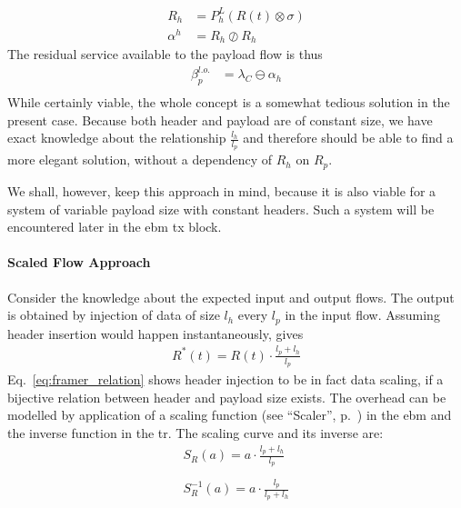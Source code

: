 %
\begin{equation}
\begin{aligned}
R_h &= {P^L_{h}(R(t) \otimes \sigma)}\\
\alpha^h &= R_h \oslash R_h
\label{eq:foi1}
\end{aligned}
\end{equation}
%
The residual service available to the payload flow is thus
%
\begin{equation}
\begin{aligned}
\beta_p^{l.o.} &= \lambda_C \ominus \alpha_h\\
\label{eq:foi2}
\end{aligned}
\end{equation}
%
While certainly viable, the whole concept is a somewhat tedious solution in the present case. Because both header and payload are of constant size, we have exact knowledge
about the relationship $\frac{l_h}{l_p}$ and therefore should be able to find a more elegant solution, without a dependency of $R_h$ on $R_p$.
\par
We shall, however, keep this approach in mind, because it is also viable for a system of variable payload size with constant headers.
Such a system will be encountered later in the \gls{ebm} \gls{tx} block.

\fi

\paragraph{Scaled Flow Approach} 
Consider the knowledge about the expected input and output flows. The output is obtained by injection of data of size $l_h$ every $l_p$ in the input flow. 
Assuming header insertion would happen instantaneously, gives
%
\begin{equation}
\begin{aligned}
R^*(t) = R(t) \cdot \frac{l_p + l_h}{l_p} 
\label{eq:framer_relation}
\end{aligned}
\end{equation}
%
Eq.~\ref{eq:framer_relation} shows header injection to be in fact data scaling, if a bijective relation between header and payload size exists.
The overhead can be modelled by application of a scaling function (see \enquote{Scaler}, p.~\pageref{ssec:nc_elementary}) in the \gls{ebm}
and the inverse function in the \gls{tr}. The scaling curve and its inverse are:
%
\begin{equation}
\begin{aligned}
S_R(a) = a \cdot \frac{l_p + l_h}{l_p}\\
\\
S_R^{-1}(a) = a \cdot \frac{l_p}{l_p + l_h}
\label{eq:scale_framer}
\end{aligned}
\end{equation}
%
